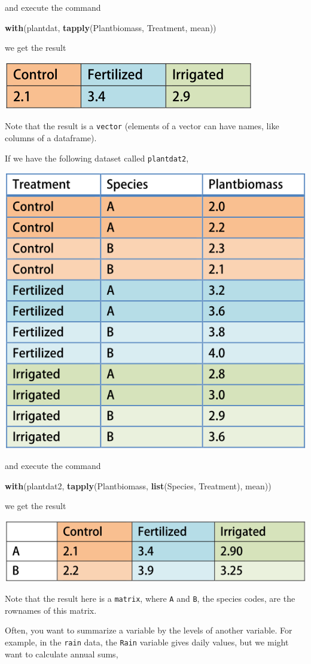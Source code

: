 \documentclass[]{book}
\newenvironment{Shaded}{\begin{snugshade}}{\end{snugshade}}
\newcommand{\KeywordTok}[1]{\textcolor[rgb]{0.13,0.29,0.53}{\textbf{#1}}}
\newcommand{\NormalTok}[1]{#1}
\begin{document}
and execute the command

\begin{Shaded}
\begin{Highlighting}[]
\KeywordTok{with}\NormalTok{(plantdat, }\KeywordTok{tapply}\NormalTok{(Plantbiomass, Treatment, mean))}
\end{Highlighting}
\end{Shaded}

we get the result

\includegraphics[width=0.33\linewidth]{screenshots/tapplyresult}

Note that the result is a \texttt{vector} (elements of a vector can have names, like columns of a dataframe).

If we have the following dataset called \texttt{plantdat2},

\includegraphics[width=0.33\linewidth]{screenshots/exampledatalarger}

and execute the command

\begin{Shaded}
\begin{Highlighting}[]
\KeywordTok{with}\NormalTok{(plantdat2, }\KeywordTok{tapply}\NormalTok{(Plantbiomass, }\KeywordTok{list}\NormalTok{(Species, Treatment), mean))}
\end{Highlighting}
\end{Shaded}

we get the result

\includegraphics[width=0.33\linewidth]{screenshots/tapplyresultlarger}

Note that the result here is a \texttt{matrix}, where \texttt{A} and \texttt{B}, the species codes, are the rownames of this matrix.

Often, you want to summarize a variable by the levels of another variable. For example, in the \texttt{rain} data, the \texttt{Rain} variable gives daily values, but we might want to calculate annual sums,
\end{document}
